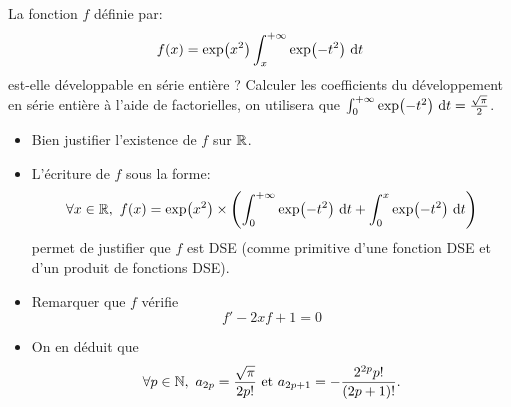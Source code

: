 La fonction $f$ définie par:
$$f(x) = \exp(x^2) \int_{x}^{+ \infty} \exp(-t^2)\ \mathrm{d} t$$
est-elle développable en série entière ? Calculer les coefficients du développement en série entière à l'aide de factorielles, on utilisera que $\int_{0}^{+\infty} \exp(-t^2)\ \mathrm{d} t = \frac{\sqrt{\pi}}{2}$. 
\begin{itemize}
    \item Bien justifier l'existence de $f$ sur $\mathbb{R}$.
    \item L'écriture de $f$ sous la forme:
    $$\forall x \in \mathbb{R},\ f(x) = \exp(x^2) \times \left(\int_{0}^{+ \infty} \exp(-t^2)\ \mathrm{d} t + \int_{0}^{x} \exp(-t^2)\ \mathrm{d} t\right)$$
    permet de justifier que $f$ est DSE (comme primitive d'une fonction DSE et d'un produit de fonctions DSE).
    \item Remarquer que $f$ vérifie
    $$f' -2xf + 1 = 0$$
    \item On en déduit que 
    $$\forall p \in \N,\ a_{2p} = \frac{\sqrt{\pi}}{2p!} \text{ et } a_{2p+1} = -\frac{2^{2p} p!}{(2p+1)!}.$$
\end{itemize}
